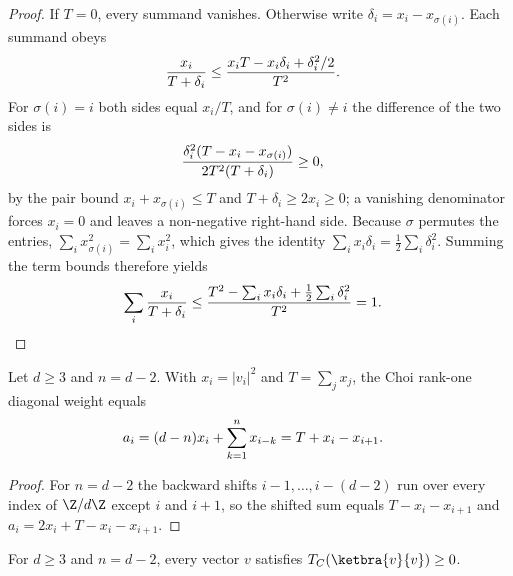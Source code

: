 \begin{proof}
    \leanok
    If $T=0$, every summand vanishes. Otherwise write
    $\delta_i=x_i-x_{\sigma(i)}$. Each summand obeys
    \begin{align}
        \frac{x_i}{T+\delta_i}
         & \le\frac{x_iT-x_i\delta_i+\delta_i^2/2}{T^2}.
        \notag
    \end{align}
    For $\sigma(i)=i$ both sides equal $x_i/T$, and for $\sigma(i)\ne i$ the
    difference of the two sides is
    \begin{align}
        \frac{\delta_i^2(T-x_i-x_{\sigma(i)})}
        {2T^2(T+\delta_i)}
         & \ge0,
        \notag
    \end{align}
    by the pair bound $x_i+x_{\sigma(i)}\le T$ and
    $T+\delta_i\ge 2x_i\ge0$; a vanishing denominator forces $x_i=0$ and leaves
    a non-negative right-hand side. Because $\sigma$ permutes the entries,
    $\sum_i x_{\sigma(i)}^2=\sum_i x_i^2$, which gives the identity
    $\sum_i x_i\delta_i=\tfrac12\sum_i\delta_i^2$. Summing the term bounds
    therefore yields
    \begin{align}
        \sum_i\frac{x_i}{T+\delta_i}
         & \le
        \frac{T^2-\sum_i x_i\delta_i+\tfrac12\sum_i\delta_i^2}{T^2}
        =1.
        \notag
    \end{align}
\end{proof}

\begin{lemma}
    \label{lem:choi_type_weight_top}
    \leanok
    Let $d\ge3$ and $n=d-2$. With $x_i=|v_i|^2$ and $T=\sum_j x_j$, the Choi
    rank-one diagonal weight equals
    \begin{align}
        a_i
         & =(d-n)x_i+\sum_{k=1}^{n}x_{i-k}
        =T+x_i-x_{i+1}.
        \notag
    \end{align}
\end{lemma}

\begin{proof}
    \leanok
    For $n=d-2$ the backward shifts $i-1,\ldots,i-(d-2)$ run over every index
    of $\Z/d\Z$ except $i$ and $i+1$, so the shifted sum equals
    $T-x_i-x_{i+1}$ and $a_i=2x_i+T-x_i-x_{i+1}$.
\end{proof}

\begin{lemma}
    \label{lem:choi_type_rankone_positive_top}
    \leanok
    For $d\ge3$ and $n=d-2$, every vector $v$ satisfies
    $T_C(\ketbra{v}{v})\ge0$.
\end{lemma}

